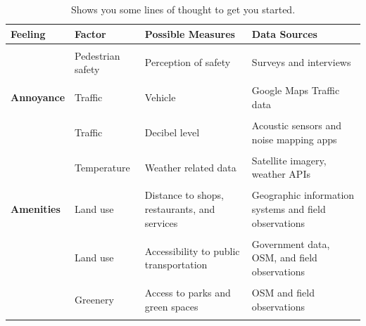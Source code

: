 \documentclass[
]{latex/krantz}
\begin{document}
\begin{table}

\caption{\label{tab:sample-feelings-measures}Shows you some lines of thought to get you started.}
\centering
\begin{tabular}[t]{>{\raggedright\arraybackslash}p{5em}l>{\raggedright\arraybackslash}p{7em}l}
\toprule
Feeling & Factor & Possible Measures & Data Sources\\
\midrule
\textbf{\cellcolor{gray!6}{Fear}} & \cellcolor{gray!6}{Pedestrian safety} & \cellcolor{gray!6}{Number of reported crimes} & \cellcolor{gray!6}{Government records}\\
\textbf{} & Pedestrian safety & Perception of safety & Surveys and interviews\\
\textbf{\cellcolor{gray!6}{}} & \cellcolor{gray!6}{Pedestrian safety} & \cellcolor{gray!6}{Lighting levels} & \cellcolor{gray!6}{Field observations and light meters}\\
\textbf{Annoyance} & Traffic & Vehicle & Google Maps Traffic data\\
\textbf{\cellcolor{gray!6}{}} & \cellcolor{gray!6}{Traffic} & \cellcolor{gray!6}{Average travel time} & \cellcolor{gray!6}{GPS data and traffic apps}\\
\addlinespace
\textbf{} & Traffic & Decibel level & Acoustic sensors and noise mapping apps\\
\textbf{\cellcolor{gray!6}{Discomfort}} & \cellcolor{gray!6}{Air quality} & \cellcolor{gray!6}{Particulate matter concentration} & \cellcolor{gray!6}{Air quality monitoring data}\\
\textbf{} & Temperature & Weather related data & Satellite imagery, weather APIs\\
\textbf{\cellcolor{gray!6}{}} & \cellcolor{gray!6}{Water-logging} & \cellcolor{gray!6}{Flood risk assessments} & \cellcolor{gray!6}{Elevation data, government data}\\
\textbf{Amenities} & Land use & Distance to shops, restaurants, and services & Geographic information systems and field observations\\
\addlinespace
\textbf{\cellcolor{gray!6}{}} & \cellcolor{gray!6}{Land use} & \cellcolor{gray!6}{Diversity of land uses} & \cellcolor{gray!6}{Government records, OSM data, Google Maps data, field observations}\\
\textbf{} & Land use & Accessibility to public transportation & Government data, OSM, and field observations\\
\textbf{\cellcolor{gray!6}{Pleasantness \& Vibrancy}} & \cellcolor{gray!6}{Greenery} & \cellcolor{gray!6}{Tree canopy coverage} & \cellcolor{gray!6}{Aerial imagery and remote sensing data}\\
\textbf{} & Greenery & Access to parks and green spaces & OSM and field observations\\
\textbf{\cellcolor{gray!6}{}} & \cellcolor{gray!6}{Greenery} & \cellcolor{gray!6}{} & \cellcolor{gray!6}{}\\
\bottomrule
\end{tabular}
\end{table}
\end{document}
